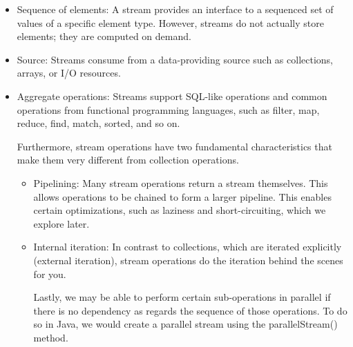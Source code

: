 \documentclass[letterpaper,12pt]{article}
\begin{document}
\begin{itemize}
      \item Sequence of elements: A stream provides an interface to a sequenced set of
            values of a specific element type. However, streams do not actually store
            elements; they are computed on demand.
      \item Source: Streams consume from a data-providing source such as collections,
            arrays, or I/O resources.
      \item Aggregate operations: Streams support SQL-like operations and common operations
            from functional programming languages, such as filter, map, reduce, find, match,
            sorted, and so on.

            Furthermore, stream operations have two fundamental characteristics that make
            them very different from collection operations.

            \begin{itemize}
                  \item Pipelining: Many stream operations return a stream themselves. This allows
                        operations to be chained to form a larger pipeline. This enables certain
                        optimizations, such as laziness and short-circuiting, which we explore later.
                  \item Internal iteration: In contrast to collections, which are iterated explicitly
                        (external iteration), stream operations do the iteration behind the scenes for
                        you.

                        Lastly, we may be able to perform certain sub-operations in parallel if there
                        is no dependency as regards the sequence of those operations. To do so in Java,
                        we would create a parallel stream using the parallelStream() method.
            \end{itemize}
\end{itemize}
\end{document}
